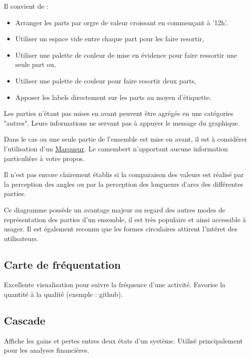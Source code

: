 \documentclass[a4paper,12pt]{article}
\begin{document}
\begin{multicols}{2}
Il convient de :
\begin{itemize}
\item Arranger les parts par orgre de valeur croissant en commençant à '12h'. \autocite{jonathanschwabishParttowhole2021}
\item Utiliser un espace vide entre chaque part pour les faire resortir, \autocite{sosulskiGraphics2019}
\item Utiliser une palette de couleur de mise en évidence pour faire ressortir une seule part ou,
\item Utiliser une palette de couleur pour faire resortir deux parts,
\item Apposer les labels directement sur les parts au moyen d'étiquette. \autocite{sosulskiGraphics2019}
\end{itemize}

Les parties n'étant pas mises en avant peuvent être agrégée en une catégories "autres". Leurs informations ne servant pas à appuyer le message du graphique. \autocite{jonathanschwabishParttowhole2021}

Dans le cas ou une seule partie de l'ensemble est mise en avant, il est à considérer l'utilisation d'un \hyperref[sec:org440e9cd]{Marqueur}. Le camembert n'apportant aucune information particulière à votre propos.

Il n'est pas encore clairement établis si la comparaison des valeurs est réalisé par la perception des angles ou par la perception des longueurs d'arcs des différentes parties.\autocite{jonathanschwabishParttowhole2021}

Ce diagramme possède un avantage majeur au regard des autres modes de représentation des parties d'un ensemble, il est très populaire et ainsi accessible à usager. \autocite{jonathanschwabishParttowhole2021} Il est également reconnu que les formes circulaires attirent l'intéret des utilisateurs.\autocite{jonathanschwabishParttowhole2021}
\subsection*{Carte de fréquentation}
\label{sec:orge86bcfd}
Excellente visualisation pour suivre la fréquence d'une activité. Favorise la quantité à la qualité (exemple : github). \autocite{alansmithLexiqueVisuel}
\subsection*{Cascade}
\label{sec:org805c3ff}
Affiche les gains et pertes entres deux états d'un système. \autocite{jonathanschwabishComparingCategories2021} Utilisé principalement pour les analyses financières. \autocite{alansmithLexiqueVisuel}

\end{multicols}
\end{document}
